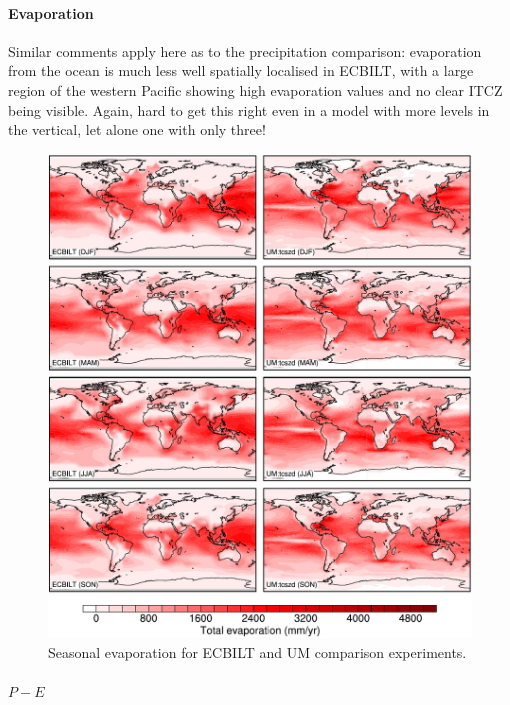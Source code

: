 \documentclass[a4paper,11pt,article]{article}
\begin{document}
\paragraph{Evaporation}

Similar comments apply here as to the precipitation comparison:
evaporation from the ocean is much less well spatially localised in
ECBILT, with a large region of the western Pacific showing high
evaporation values and no clear ITCZ being visible.  Again, hard to
get this right even in a model with more levels in the vertical, let
alone one with only three!

\begin{figure}
  \begin{center}
    \includegraphics[width=\textwidth]{../expt-1/plots/evap-plots}
  \end{center}
  \caption{Seasonal evaporation for ECBILT and UM comparison
    experiments.}
  \label{fig:evap}
\end{figure}

\paragraph{$P-E$}
\end{document}
